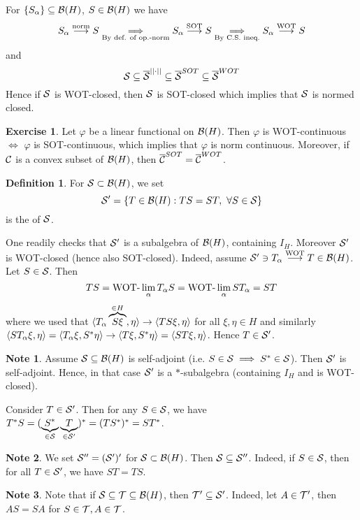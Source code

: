 \documentclass[10pt,english,a4paper]{article}
\theoremstyle{definition}
\newtheorem*{definition}{Definition}
\newtheorem*{exercise}{Exercise}
\newtheorem*{note}{Note}
\let\emph\relax %
\def\vphi{\varphi}
\begin{document}
For $\{S_{\alpha}\} \subseteq \mathcal{B}(H)$, $S \in \mathcal{B}(H) $ we have 
\[ S_{\alpha} \overset{\text{norm}}{\longrightarrow} S
\underset{\text{By def. of op.-norm}}{\implies}
S_{\alpha} \overset{\text{SOT}}{\longrightarrow} S
\underset{\text{By C.S. ineq.}}{\implies}
S_{\alpha} \overset{\text{WOT}}{\longrightarrow} S
\]
and
\[ \mathcal{S} \subseteq \overline{\mathcal{S}}^{||\cdot||} \subseteq \overline{\mathcal{S}}^{SOT} \subseteq \overline{\mathcal{S}}^{WOT} \]
Hence if $\mathcal{S}$ is WOT-closed, then $\mathcal{S}$ is SOT-closed which implies that 
$\mathcal{S}$ is normed closed.

\begin{exercise}
Let $\vphi$ be a linear functional on $\mathcal{B}(H)$. Then $\vphi$ is WOT-continuous 
$\iff$ $\vphi$ is SOT-continuous, which implies that $\vphi$ is norm continuous.
Moreover, if $\mathcal{C}$ is a convex subset of $\mathcal{B}(H)$, then 
$\overline{\mathcal{C}}^{SOT} = \overline{\mathcal{C}}^{WOT}$.
\end{exercise}

\begin{definition}
    For $\mathcal{S}\subset\mathcal{B}(H)$, we set 
\[\mathcal{S}' = \{T \in \mathcal{B}(H): TS=ST,~\forall S\in \mathcal{S}\}\]
is the \emph{commutant} of $\mathcal{S}$.
\end{definition}

One readily checks that $\mathcal{S}'$ is a subalgebra of $\mathcal{B}(H)$, containing $I_H$.
Moreover $\mathcal{S}'$ is WOT-closed (hence also SOT-closed).
Indeed, assume $\mathcal{S}' \ni T_{\alpha}\overset{\text{WOT}}{\longrightarrow} T \in \mathcal{B}(H)$.
Let $S \in \mathcal{S}$. Then 
\[TS = \text{WOT-}\lim_{\alpha} T_{\alpha}S = \text{WOT-}\lim_{\alpha}ST_{\alpha} = ST \]
where we used that 
$\langle T_{\alpha}\overbrace{S\xi}^{\in H},\eta \rangle \to \left\langle TS\xi,\eta \right\rangle$
for all $\xi,\eta \in H$ and 
similarly $\left\langle ST_{\alpha}\xi,\eta \right\rangle = \left\langle T_{\alpha}\xi,S^*\eta \right\rangle \to
\left\langle T\xi,S^*\eta \right\rangle = \left\langle ST\xi,\eta \right\rangle$.
Hence $T \in \mathcal{S}'$.


\begin{note}
Assume $\mathcal{S}\subseteq \mathcal{B}(H)$ is self-adjoint (i.e. $S \in \mathcal{S} \implies S^* \in \mathcal{S}$).
Then $\mathcal{S}'$ is self-adjoint. Hence, in that case  $\mathcal{S}'$ is  a $*$-subalgebra
(containing  $I_H$ and is WOT-closed).  
\end{note}
Consider $T \in \mathcal{S}'$. Then for any $S \in \mathcal{S}$, we have 
$T^*S = (\underbrace{S^*}_{\in \mathcal{S}}\underbrace{T}_{\in \mathcal{S}'})^* = (TS^*)^* = ST^*$.

\begin{note}
We set $\mathcal{S}'' = (\mathcal{S}')'$ for $\mathcal{S} \subset \mathcal{B}(H)$.
Then $\mathcal{S} \subseteq \mathcal{S}''$.
Indeed, if $S \in \mathcal{S}$, then for all $T \in \mathcal{S}'$, we have $ST = TS$.
\end{note}

\begin{note}
Note that if $\mathcal{S} \subseteq \mathcal{T} \subseteq \mathcal{B}(H)$, then 
 $\mathcal{T}' \subseteq \mathcal{S}'$. 
Indeed, let $A \in \mathcal{T}'$, then $AS = SA$ for $S \in \mathcal{T}, A \in \mathcal{T}$.
\end{note}
\end{document}
